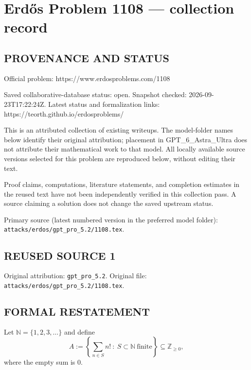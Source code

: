 \section*{Erd\H{o}s Problem 1108 --- collection record}

\subsection*{PROVENANCE AND STATUS}
Official problem: https://www.erdosproblems.com/1108

Saved collaborative-database status: open.
Snapshot checked: 2026-09-23T17:22:24Z.
Latest status and formalization links: https://teorth.github.io/erdosproblems/

This is an attributed collection of existing writeups. The model-folder names below identify their original attribution; placement in GPT\_6\_Astra\_Ultra does not attribute their mathematical work to that model. All locally available source versions selected for this problem are reproduced below, without editing their text.

Proof claims, computations, literature statements, and completion estimates in the reused text have not been independently verified in this collection pass. A source claiming a solution does not change the saved upstream status.

Primary source (latest numbered version in the preferred model folder): \texttt{attacks/erdos/gpt\_pro\_5.2/1108.tex}.

\subsection*{REUSED SOURCE 1}
Original attribution: \texttt{gpt\_pro\_5.2}.
Original file: \texttt{attacks/erdos/gpt\_pro\_5.2/1108.tex}.


\subsection*{FORMAL RESTATEMENT}
Let $\mathbb{N}=\{1,2,3,\dots\}$ and define
\[A := \left\{ \sum_{n\in S} n! \ :\  S\subset \mathbb{N}\ \text{finite}\right\} \subseteq \mathbb{Z}_{\ge 0},\]
where the empty sum is $0$.

